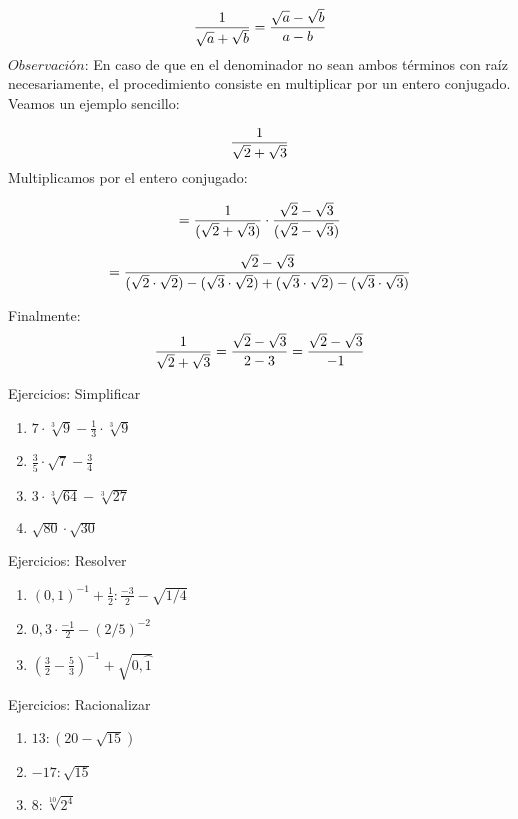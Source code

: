 \begin{equation}
    \notag
     \frac{1}{\sqrt{a}+\sqrt{b}}= \frac{\sqrt{a}-\sqrt{b}}{a-b}
\end{equation}
$Observación$: En caso de que en el denominador no sean ambos términos con raíz necesariamente, el procedimiento consiste en multiplicar por un entero conjugado.\\
\medskip
Veamos un ejemplo sencillo: 

\begin{equation}
    \notag
    \frac{1}{\sqrt{2}+\sqrt{3}} 
\end{equation}
Multiplicamos por el entero conjugado:

\begin{equation}
    \notag
    =\frac{1}{(\sqrt{2}+\sqrt{3})} \cdot \frac{\sqrt{2}-\sqrt{3}}{(\sqrt{2}-\sqrt{3})}
\end{equation}

\begin{equation}
    \notag
=\frac{\sqrt{2}-\sqrt{3}}{(\sqrt{2}\cdot \sqrt{2})-(\sqrt{3}\cdot \sqrt{2})+(\sqrt{3}\cdot \sqrt{2})-(\sqrt{3}\cdot \sqrt{3})}
\end{equation}

Finalmente:
\begin{equation}
    \notag
    \frac{1}{\sqrt{2}+\sqrt{3}} = \frac{\sqrt{2}-\sqrt{3}}{2-3} =  \frac{\sqrt{2}-\sqrt{3}}{-1} 
\end{equation}

Ejercicios: Simplificar

\begin{enumerate}
\renewcommand{\labelenumi}{{\theenumi})}
\item $7\cdot \sqrt[3]{9}- \frac{1}{3}\cdot  \sqrt[3]{9}$
\item $\frac{3}{5}\cdot \sqrt{7}-\frac{3}{4}$
\item $3\cdot \sqrt[3]{64}-\sqrt[3]{27}$
\item $\sqrt{80}\cdot \sqrt{30}$
\end{enumerate}

Ejercicios: Resolver

\begin{enumerate}
\renewcommand{\labelenumi}{{\theenumi})}
\item $(0,1)^{-1}+\frac{1}{2}:\frac{-3}{2}-\sqrt{1/4}$
\item $0,3\cdot \frac{-1}{2}-(2/5)^{-2}$
\item $(\frac{3}{2}-\frac{5}{3})^{-1}+\sqrt{0,\wideparen{1}}$
\end{enumerate}

Ejercicios: Racionalizar

\begin{enumerate}
\renewcommand{\labelenumi}{{\theenumi})}
\item ${13}:(20-\sqrt{15})$
\item $-17:\sqrt{15}$
\item $8:\sqrt[10]{2^4}$
\end{enumerate}